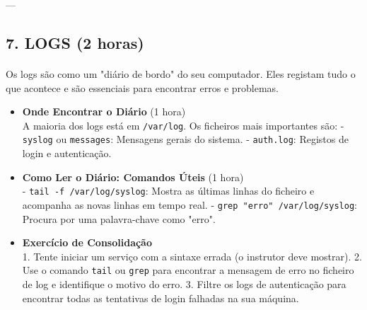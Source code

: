 \documentclass[10pt,a4paper]{article}
\begin{document}
	---
	
	\subsection*{7. LOGS (2 horas)}
	\vspace{-1.2em}
	\paragraph{}
	Os logs são como um "diário de bordo" do seu computador. Eles registam tudo o que acontece e são essenciais para encontrar erros e problemas.
	
	\begin{itemize}
		\item \textbf{Onde Encontrar o Diário} (1 hora) \\
		A maioria dos logs está em \texttt{/var/log}. Os ficheiros mais importantes são:
		- \texttt{syslog} ou \texttt{messages}: Mensagens gerais do sistema.
		- \texttt{auth.log}: Registos de login e autenticação.
		
		\item \textbf{Como Ler o Diário: Comandos Úteis} (1 hora) \\
		- \texttt{tail -f /var/log/syslog}: Mostra as últimas linhas do ficheiro e acompanha as novas linhas em tempo real.
		- \texttt{grep "erro" /var/log/syslog}: Procura por uma palavra-chave como "erro".
		
		\item \textbf{Exercício de Consolidação} \\
		1. Tente iniciar um serviço com a sintaxe errada (o instrutor deve mostrar).
		2. Use o comando \texttt{tail} ou \texttt{grep} para encontrar a mensagem de erro no ficheiro de log e identifique o motivo do erro.
		3. Filtre os logs de autenticação para encontrar todas as tentativas de login falhadas na sua máquina.
	\end{itemize}
	
\end{document}
